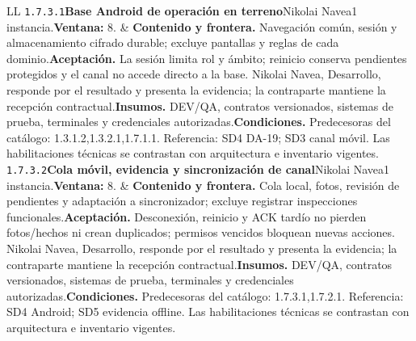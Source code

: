 \begin{longtable}{L{\tabcolsep\relax}L{\tabcolsep\relax}}
\texttt{1.\allowbreak{}7.\allowbreak{}3.\allowbreak{}1}\newline{}\textbf{Base Android de operación en terreno}\newline{}Nikolai Navea\newline{}1 instancia.\newline{}\textbf{Ventana:} 8. & \textbf{Contenido y frontera.} Navegación común, sesión y almacenamiento cifrado durable; excluye pantallas y reglas de cada dominio.\newline{}\textbf{Aceptación.} La sesión limita rol y ámbito; reinicio conserva pendientes protegidos y el canal no accede directo a la base. Nikolai Navea, Desarrollo, responde por el resultado y presenta la evidencia; la contraparte mantiene la recepción contractual.\newline{}\textbf{Insumos.} DEV/QA, contratos versionados, sistemas de prueba, terminales y credenciales autorizadas.\newline{}\textbf{Condiciones.} Predecesoras del catálogo: 1.3.1.2,1.3.2.1,1.7.1.1. Referencia: SD4 DA-19; SD3 canal móvil. Las habilitaciones técnicas se contrastan con arquitectura e inventario vigentes.\\\hline
\texttt{1.\allowbreak{}7.\allowbreak{}3.\allowbreak{}2}\newline{}\textbf{Cola móvil, evidencia y sincronización de canal}\newline{}Nikolai Navea\newline{}1 instancia.\newline{}\textbf{Ventana:} 8. & \textbf{Contenido y frontera.} Cola local, fotos, revisión de pendientes y adaptación a sincronizador; excluye registrar inspecciones funcionales.\newline{}\textbf{Aceptación.} Desconexión, reinicio y ACK tardío no pierden fotos/hechos ni crean duplicados; permisos vencidos bloquean nuevas acciones. Nikolai Navea, Desarrollo, responde por el resultado y presenta la evidencia; la contraparte mantiene la recepción contractual.\newline{}\textbf{Insumos.} DEV/QA, contratos versionados, sistemas de prueba, terminales y credenciales autorizadas.\newline{}\textbf{Condiciones.} Predecesoras del catálogo: 1.7.3.1,1.7.2.1. Referencia: SD4 Android; SD5 evidencia offline. Las habilitaciones técnicas se contrastan con arquitectura e inventario vigentes.\\\hline

\end{longtable}
